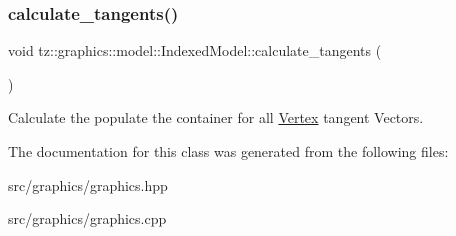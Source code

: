 \subsubsection{\texorpdfstring{calculate\+\_\+tangents()}{calculate\_tangents()}}
{\footnotesize\ttfamily void tz\+::graphics\+::model\+::\+Indexed\+Model\+::calculate\+\_\+tangents (\begin{DoxyParamCaption}{ }\end{DoxyParamCaption})}

Calculate the populate the container for all \mbox{\hyperlink{class_vertex}{Vertex}} tangent Vectors. 

The documentation for this class was generated from the following files\+:\begin{DoxyCompactItemize}
\item 
src/graphics/graphics.\+hpp\item 
src/graphics/graphics.\+cpp\end{DoxyCompactItemize}
